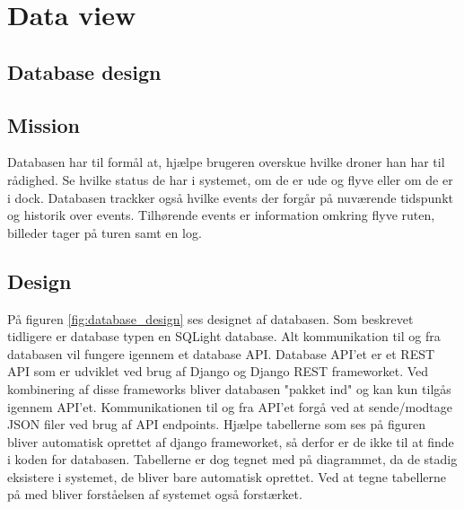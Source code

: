 \section{Data view}

\subsection{Database design}

\subsection{Mission}
Databasen har til formål at, hjælpe brugeren overskue hvilke droner han har til rådighed. Se hvilke status de har i systemet, om de er ude og flyve eller om de er i dock. Databasen trackker også hvilke events der forgår på nuværende tidspunkt og historik over events. Tilhørende events er information omkring flyve ruten, billeder tager på turen samt en log.

\subsection{Design}
På figuren \ref{fig:database_design} ses designet af databasen. Som beskrevet tidligere er database typen en SQLight database. Alt kommunikation til og fra databasen vil fungere igennem et database API. Database API'et er et REST API som er udviklet ved brug af Django og Django REST frameworket. Ved kombinering af disse frameworks bliver databasen "pakket ind" og kan kun tilgås igennem API'et. Kommunikationen til og fra API'et forgå ved at sende/modtage JSON filer ved brug af API endpoints. Hjælpe tabellerne som ses på figuren bliver automatisk oprettet af django frameworket, så derfor er de ikke til at finde i koden for databasen. Tabellerne er dog tegnet med på diagrammet, da de stadig eksistere i systemet, de bliver bare automatisk oprettet. Ved at tegne tabellerne på med bliver forståelsen af systemet også forstærket. 

